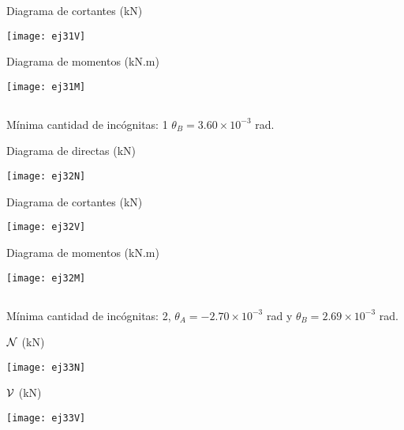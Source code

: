 Diagrama de cortantes (kN)

	\begin{center}
	\texttt{[image: ej31V]}
\end{center}

Diagrama de momentos (kN.m)

	\begin{center}
	\texttt{[image: ej31M]}
\end{center}



\subsection{}

Mínima cantidad de incógnitas: 1 $\theta_B = 3.60 \times 10^{-3}$ rad.

Diagrama de directas (kN)

	\begin{center}
	\texttt{[image: ej32N]}
\end{center}

Diagrama de cortantes (kN)

	\begin{center}
	\texttt{[image: ej32V]}
\end{center}

Diagrama de momentos (kN.m)

	\begin{center}
	\texttt{[image: ej32M]}
\end{center}


\subsection{}

Mínima cantidad de incógnitas: 2, $\theta_A = -2.70 \times 10^{-3}$ rad y $\theta_B = 2.69 \times 10^{-3}$ rad.

${\mathcal N}$ (kN)

	\begin{center}
	\texttt{[image: ej33N]}
\end{center}

${\mathcal V}$ (kN)

	\begin{center}
	\texttt{[image: ej33V]}
\end{center}

